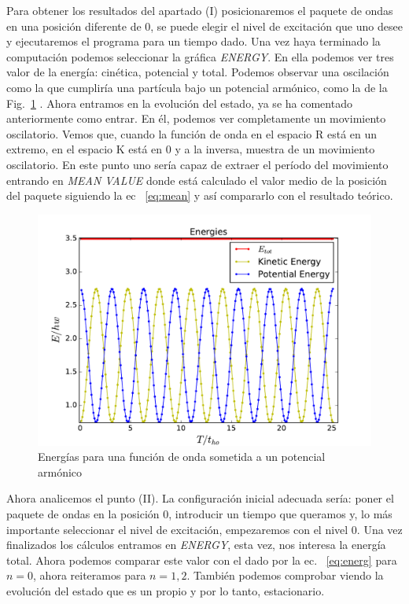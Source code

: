 Para obtener los resultados del apartado (I) posicionaremos el paquete de ondas en una posici\'on diferente de 0, se puede elegir el nivel de excitaci\'on que uno desee y ejecutaremos el programa para un tiempo dado. Una vez haya terminado la computaci\'on podemos seleccionar la gr\'afica\textit{ ENERGY}. En ella podemos ver tres valor de la energ\'ia: cin\'etica, potencial y total. Podemos observar una oscilaci\'on como la que cumplir\'ia una part\'icula bajo un potencial arm\'onico, como la de la Fig.~\ref{Fig:harm} . Ahora entramos en la evoluci\'on del estado, ya se ha comentado anteriormente como entrar. En \'el, podemos ver completamente un movimiento oscilatorio. Vemos que, cuando la funci\'on de onda en el espacio R est\'a en un extremo, en el espacio K est\'a en 0 y a la inversa, muestra de un movimiento oscilatorio. En este punto uno ser\'ia capaz de extraer el per\'iodo del movimiento entrando en \textit{MEAN VALUE} donde est\'a calculado el valor medio de la posici\'on del paquete siguiendo la ec ~\eqref{eq:mean} y as\'i compararlo con el resultado te\'orico.
\linebreak

\begin{figure}[tb]
	\centering
	\includegraphics[width=0.9\linewidth]{harm.pdf}
	\caption{Energ\'ias para una funci\'on de onda sometida a un potencial arm\'onico}
	\label{Fig:harm}
\end{figure}
Ahora analicemos el punto (II). La configuraci\'on inicial adecuada ser\'ia: poner el paquete de ondas en la posici\'on 0, introducir un tiempo que queramos y, lo m\'as importante seleccionar el nivel de excitaci\'on, empezaremos con el nivel 0. Una vez finalizados los c\'alculos entramos en \textit{ENERGY}, esta vez, nos interesa la energ\'ia total. Ahora podemos comparar este valor con el dado por la ec. ~\eqref{eq:energ} para $n=0$, ahora reiteramos para $n=1,2$. Tambi\'en podemos comprobar viendo la evoluci\'on del estado que es un propio y por lo tanto, estacionario.
